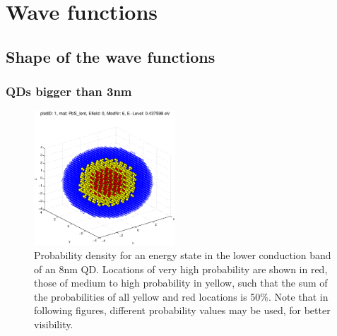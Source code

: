\section{Wave functions}

\subsection{Shape of the wave functions}

\subsubsection{QDs bigger than 3nm} 

\begin{figure}[htbp]
	\centering
	\includegraphics[width=200px]{Fig/Plots/r4CBMod6}
	\caption{Probability density for an energy state in the lower conduction band of an 8nm QD. Locations of very high probability are shown in red, those of medium to high probability in yellow, such that the sum of the probabilities of all yellow and red locations is 50\%. Note that in following figures, different probability values may be used, for better visibility.}
	\label{fig:sphericalWaveFn}
\end{figure}
%
